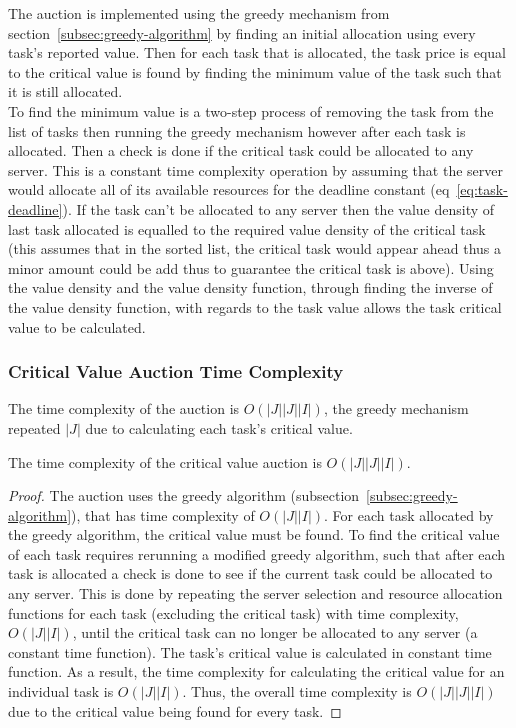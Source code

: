 The auction is implemented using the greedy mechanism from section~\ref{subsec:greedy-algorithm} by finding an initial
allocation using every task's reported value. Then for each task that is allocated, the task price is equal to the
critical value is found by finding the minimum value of the task such that it is still allocated. \\
To find the minimum value is a two-step process of removing the task from the list of tasks then running the greedy
mechanism however after each task is allocated. Then a check is done if the critical task could be allocated to any
server. This is a constant time complexity operation by assuming that the server would allocate all of its available
resources for the deadline constant (eq~\ref{eq:task-deadline}). If the task can't be allocated to any server then the
value density of last task allocated is equalled to the required value density of the critical task (this assumes that
in the sorted list, the critical task would appear ahead thus a minor amount could be add thus to guarantee the
critical task is above). Using the value density and the value density function, through finding the inverse of the
value density function, with regards to the task value allows the task critical value to be calculated.

\subsubsection{Critical Value Auction Time Complexity}
\label{subsubsec:critical-value-auction-time-complexity}
The time complexity of the auction is $O(\left|J\right| \left|J\right| \left|I\right|)$, the greedy
mechanism repeated $\left|J\right|$ due to calculating each task's critical value.
\begin{theorem}
    The time complexity of the critical value auction is $O(\left|J\right| \left|J\right| \left|I\right|)$.
\end{theorem}
\begin{proof}
    The auction uses the greedy algorithm (subsection~\ref{subsec:greedy-algorithm}), that has time complexity of
    $O(\left|J\right| \left|I\right|)$. For each task allocated by the greedy algorithm, the critical value must be
    found. To find the critical value of each task requires rerunning a modified greedy algorithm, such that after each
    task is allocated a check is done to see if the current task could be allocated to any server. This is done by repeating the server selection and resource allocation functions for each task (excluding
    the critical task) with time complexity,
    $O(\left|J\right| \left|I\right|)$, until the critical task can no longer be allocated to any server (a constant time function).
    The task's critical value is calculated in constant time function. As a result, the time complexity for
    calculating the critical value for an individual task is $O(\left|J\right| \left|I\right|)$. Thus, the overall time
    complexity is $O(\left|J\right| \left|J\right| \left|I\right|)$ due to the critical value being
    found for every task.
\end{proof}

